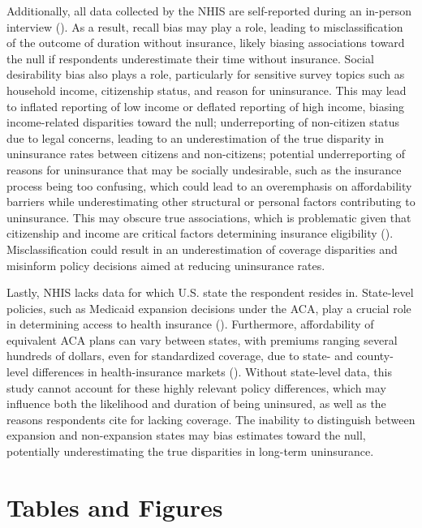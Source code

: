 \documentclass[12pt]{article}
\begin{document}
Additionally, all data collected by the NHIS are self-reported during an in-person interview (\cite{centers_for_disease_control_and_prevention_about_2024}). As a result, recall bias may play a role, leading to misclassification of the outcome of duration without insurance, likely biasing associations toward the null if respondents underestimate their time without insurance. Social desirability bias also plays a role, particularly for sensitive survey topics such as household income, citizenship status, and reason for uninsurance. This may lead to inflated reporting of low income or deflated reporting of high income, biasing income-related disparities toward the null; underreporting of non-citizen status due to legal concerns, leading to an underestimation of the true disparity in uninsurance rates between citizens and non-citizens; potential underreporting of reasons for uninsurance that may be socially undesirable, such as the insurance process being too confusing, which could lead to an overemphasis on affordability barriers while underestimating other structural or personal factors contributing to uninsurance. This may obscure true associations, which is problematic given that citizenship and income are critical factors determining insurance eligibility (\cite{us_general_services_administration_how_2025, kff_key_2025}). Misclassification could result in an underestimation of coverage disparities and misinform policy decisions aimed at reducing uninsurance rates. 

Lastly, NHIS lacks data for which U.S. state the respondent resides in. State-level policies, such as Medicaid expansion decisions under the ACA, play a crucial role in determining access to health insurance (\cite{pope_reforming_2021}). Furthermore, affordability of equivalent ACA plans can vary between states, with premiums ranging several hundreds of dollars, even for standardized coverage, due to state- and county-level differences in health-insurance markets (\cite{pope_reforming_2021}). Without state-level data, this study cannot account for these highly relevant policy differences, which may influence both the likelihood and duration of being uninsured, as well as the reasons respondents cite for lacking coverage. The inability to distinguish between expansion and non-expansion states may bias estimates toward the null, potentially underestimating the true disparities in long-term uninsurance.


\newpage
\section{Tables and Figures}
\end{document}
